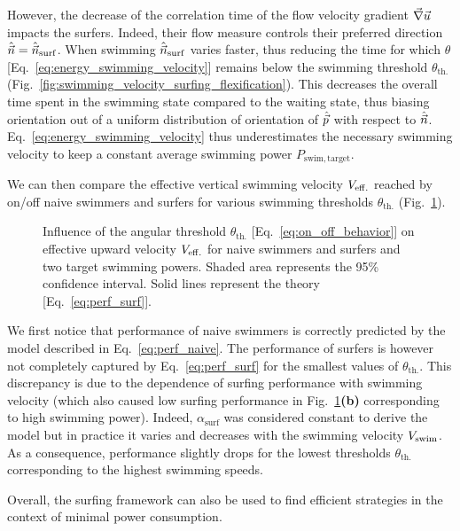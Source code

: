 However, the decrease of the correlation time of the flow velocity gradient $\vec{\nabla} \vec{u}$ impacts the surfers.
Indeed, their flow measure controls their preferred direction $\hat{\vec{n}} = \hat{\vec{n}}_{\mathrm{surf}}$.
When swimming $\hat{\vec{n}}_{\mathrm{surf}}$ varies faster, thus reducing the time for which $\theta$ [Eq.~\eqref{eq:energy_swimming_velocity}] remains below the swimming threshold $\theta_{\mathrm{th.}}$ (Fig.~\ref{fig:swimming_velocity_surfing_flexification}).
This decreases the overall time spent in the swimming state compared to the waiting state, thus biasing orientation out of a uniform distribution of orientation of $\hat{\vec{p}}$ with respect to $\hat{\vec{n}}$.
Eq.~\eqref{eq:energy_swimming_velocity} thus underestimates the necessary swimming velocity to keep a constant average swimming power $P_{\mathrm{swim}, \mathrm{target}}$.

We can then compare the effective vertical swimming velocity $V_{\mathrm{eff.}}$ reached by on/off naive swimmers and surfers for various swimming thresholds $\theta_{\mathrm{th.}}$ (Fig.~\ref{fig:energy_efficiency_threshold}).
\begin{figure}%
	\centering
	
	\caption[Influence of the angular threshold on effective upward velocity.]{
		Influence of the angular threshold $\theta_{\mathrm{th.}}$ [Eq.~\eqref{eq:on_off_behavior}] on effective upward velocity $V_{\mathrm{eff.}}$ for naive swimmers and surfers and two target swimming powers.
		Shaded area represents the 95\% confidence interval.
		Solid lines represent the theory [Eq.~\eqref{eq:perf_surf}].
	}
	\label{fig:energy_efficiency_threshold}
\end{figure}
We first notice that performance of naive swimmers is correctly predicted by the model described in Eq.~\eqref{eq:perf_naive}.
The performance of surfers is however not completely captured by Eq.~\eqref{eq:perf_surf} for the smallest values of $\theta_{\mathrm{th.}}$.
This discrepancy is due to the dependence of surfing performance with swimming velocity (which also caused low surfing performance in Fig.~\ref{fig:energy_efficiency_threshold}\textbf{(b)} corresponding to high swimming power).
Indeed, $\alpha_{\mathrm{surf}}$ was considered constant to derive the model but in practice it varies and decreases with the swimming velocity $V_{\mathrm{swim}}$.
As a consequence, performance slightly drops for the lowest thresholds $\theta_{\mathrm{th.}}$ corresponding to the highest swimming speeds.

Overall, the surfing framework can also be used to find efficient strategies in the context of minimal power consumption.
